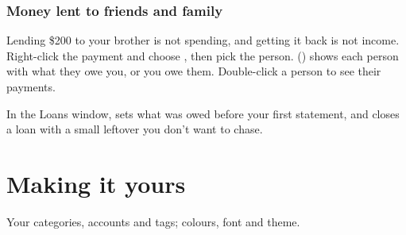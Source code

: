 \documentclass[11pt]{article}
\begin{document}
\subsection{Money lent to friends and family}
Lending \$200 to your brother is not spending, and getting it back is not income. Right-click the
payment and choose , then pick the person. 
() shows each person with what they owe you, or you owe them. Double-click a
person to see their payments.

\begin{tip}
In the Loans window,  sets what was owed before your first statement, and
 closes a loan with a small leftover you don't want to chase.
\end{tip}

\chapter{Making it yours}{Your categories, accounts and tags; colours, font and theme.}\label{ch:8}
\end{document}

